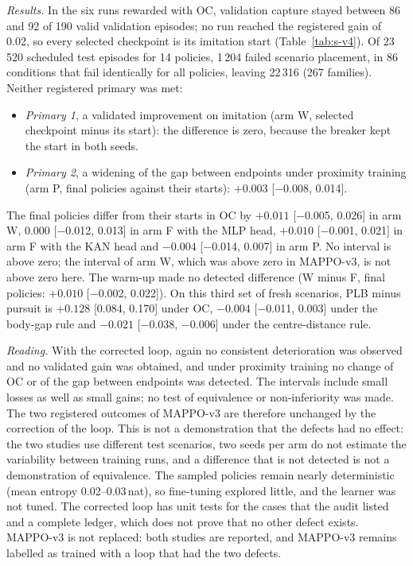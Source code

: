 \documentclass[preprint,12pt]{elsarticle}
\begin{document}
\emph{Results.} In the six runs rewarded with OC, validation capture stayed between 86 and 92 of 190 valid
validation episodes; no
run reached the registered gain of 0.02, so every selected checkpoint is its imitation start
(Table~\ref{tab:s-v4}). Of 23\,520 scheduled test episodes for 14 policies, 1\,204 failed scenario placement, in 86
conditions that fail identically for all policies, leaving 22\,316 (267 families). Neither registered primary was
met:
\begin{itemize}
\item \emph{Primary 1}, a validated improvement on imitation (arm W, selected checkpoint minus its start): the
difference is zero, because the breaker kept the start in both seeds.
\item \emph{Primary 2}, a widening of the gap between endpoints under proximity training (arm P, final policies
against their starts): $+0.003$ [$-$0.008, 0.014].
\end{itemize}
The final policies differ from their starts in OC by $+0.011$ [$-$0.005, 0.026] in arm W, $0.000$ [$-$0.012, 0.013]
in arm F with the MLP head, $+0.010$ [$-$0.001, 0.021] in arm F with the KAN head and $-0.004$ [$-$0.014, 0.007] in
arm P. No interval is above zero; the interval of arm W, which was above zero in MAPPO-v3, is not above zero here.
The warm-up made no detected difference (W minus F, final policies: $+0.010$ [$-$0.002, 0.022]). On this third set of
fresh scenarios, PLB minus pursuit is $+0.128$ [0.084, 0.170] under OC, $-0.004$ [$-$0.011, 0.003] under the body-gap
rule and $-0.021$ [$-$0.038, $-$0.006] under the centre-distance rule.

\emph{Reading.} With the corrected loop, again no consistent deterioration was observed and no validated gain was
obtained, and under proximity training no change of OC or of the gap between endpoints was detected. The intervals
include small losses as well as small gains; no test of equivalence or non-inferiority was made. The two registered outcomes of
MAPPO-v3 are therefore unchanged by the correction of the loop. This is not a demonstration that the defects had no
effect: the two studies use different test scenarios, two seeds per arm do not estimate the variability between
training runs, and a difference that is not detected is not a demonstration of equivalence. The sampled policies
remain nearly deterministic (mean entropy 0.02--0.03\,nat), so fine-tuning explored little, and the learner was not
tuned. The corrected loop has unit tests for the cases that the audit listed and a complete ledger, which does not
prove that no other defect exists. MAPPO-v3 is not replaced: both studies are reported, and MAPPO-v3 remains
labelled as trained with a loop that had the two defects.
\end{document}
